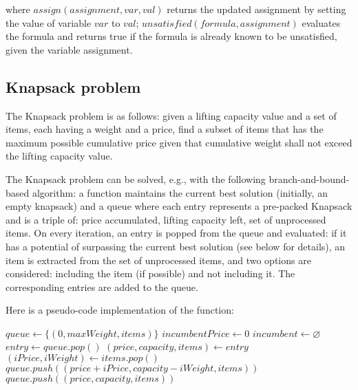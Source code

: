 where $assign(assignment, var, val)$ returns the updated assignment by setting the value
of variable $var$ to $val$; $unsatisfied(formula, assignment)$ evaluates the formula and
returns true if the formula is already known to be unsatisfied, given the variable assignment.

\subsection{Knapsack problem}

The Knapsack problem is as follows: given a lifting capacity value and a set of items,
each having a weight and a price, find a subset of items that has the maximum possible
cumulative price given that cumulative weight shall not exceed the lifting capacity value.

The Knapsack problem can be solved, e.g., with the following branch-and-bound-based algorithm:
a function maintains the current best solution (initially, an empty knapsack) and a queue where
each entry represents a pre-packed Knapsack and is a triple of:
price accumulated, lifting capacity left, set of unprocessed items. On every iteration,
an entry is popped from the queue and evaluated: if it has a potential of surpassing the
current best solution (see below for details), an item is extracted from the set of unprocessed items, and two options are considered: including the item (if possible) and not including it.
The corresponding entries are added to the queue.

Here is a pseudo-code implementation of the function:

\begin{algorithm}
\begin{algorithmic}
    \State $queue \gets \{(0, maxWeight, items)\}$
    \State $incumbentPrice \gets 0$
    \State $incumbent \gets \varnothing$
        \State $entry \gets queue.pop()$
            \State $(price, capacity, items) \gets entry$
            \State $(iPrice, iWeight) \gets items.pop()$
                \State $queue.push((price + iPrice, capacity - iWeight, items))$
            \EndIf
            \State $queue.push((price, capacity, items))$
        \EndIf
    \EndWhile
    \State {}
\EndProcedure
\end{algorithmic}
\end{algorithm}

